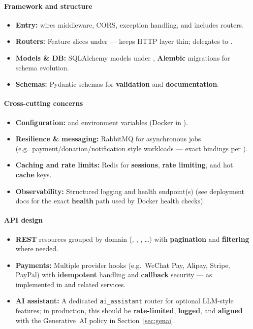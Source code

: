\documentclass[11pt,a4paper]{article}
\begin{document}
\paragraph{Framework and structure}
\begin{itemize}
  \item \textbf{Entry:}  wires middleware, CORS, exception handling, and includes routers.
  \item \textbf{Routers:} Feature slices under  --- keeps HTTP layer thin; delegates to .
  \item \textbf{Models \& DB:} SQLAlchemy models under , \textbf{Alembic} migrations for schema evolution.
  \item \textbf{Schemas:} Pydantic schemas for \textbf{validation} and \textbf{documentation}.
\end{itemize}

\paragraph{Cross-cutting concerns}
\begin{itemize}
  \item \textbf{Configuration:}  and environment variables (Docker  in ).
  \item \textbf{Resilience \& messaging:} RabbitMQ for asynchronous jobs (e.g.\ payment/donation/notification style workloads --- exact bindings per ).
  \item \textbf{Caching and rate limits:} Redis for \textbf{sessions}, \textbf{rate limiting}, and hot \textbf{cache} keys.
  \item \textbf{Observability:} Structured logging and health endpoint(s) (see deployment docs for the exact \textbf{health} path used by Docker health checks).
\end{itemize}

\paragraph{API design}
\begin{itemize}
  \item \textbf{REST} resources grouped by domain (, , , \ldots) with \textbf{pagination} and \textbf{filtering} where needed.
  \item \textbf{Payments:} Multiple provider hooks (e.g.\ WeChat Pay, Alipay, Stripe, PayPal) with \textbf{idempotent} handling and \textbf{callback} security --- as implemented in  and related services.
  \item \textbf{AI assistant:} A dedicated \texttt{ai\_assistant} router for optional LLM-style features; in production, this should be \textbf{rate-limited}, \textbf{logged}, and \textbf{aligned} with the Generative~AI policy in Section~\ref{sec:genai}.
\end{itemize}
\end{document}
